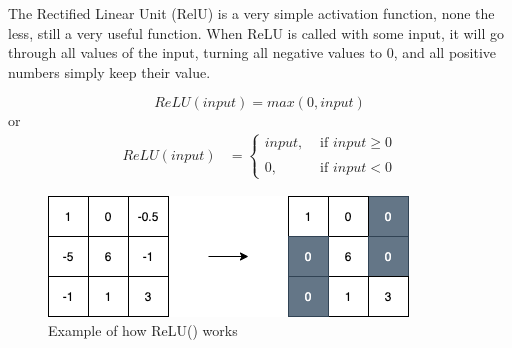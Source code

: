 The Rectified Linear Unit (RelU) is a very simple activation function, none the less, still a very useful function. When ReLU is called with some input, it will go through all values of the input, turning all negative values to 0, and all positive numbers simply keep their value.

$$
ReLU(input) = max(0,input)
$$
or
\begin{align}
  ReLU(input) &=\left\{
  \begin{matrix}
    input, & \text{ if } input \geq 0\\
    \\
    0,  &\text{ if } input < 0
  \end{matrix}
  \right.
\end{align}

\begin{figure}[!ht]
  \centering
  \includegraphics[scale=0.4]{latex/imgs/relu.png}
  \caption{Example of how ReLU() works}\label{Baseline:before}
\end{figure}
